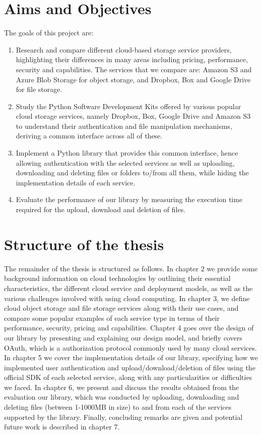 \section{Aims and Objectives}
The goals of this project are:

\begin{enumerate}
	\item Research and compare different cloud-based storage service providers, highlighting their differences in many areas including pricing, performance, security and capabilities. The services that we compare are: Amazon S3 and Azure Blob Storage for object storage, and Dropbox, Box and Google Drive for file storage.
	
	\item Study the Python Software Development Kits offered by various popular cloud storage services, namely Dropbox, Box, Google Drive and Amazon S3 to understand their authentication and file manipulation mechanisms, deriving a common interface across all of these.
	
	\item Implement a Python library that provides this common interface, hence allowing authentication with the selected services as well as uploading, downloading and deleting files or folders to/from all them, while hiding the implementation details of each service.
	
	\item Evaluate the performance of our library by measuring the execution time required for the upload, download and deletion of files.
\end{enumerate}

\section{Structure of the thesis}
The remainder of the thesis is structured as follows. In chapter 2 we provide some background information on cloud technologies by outlining their essential characteristics, the different cloud service and deployment models, as well as the various challenges involved with using cloud computing. In chapter 3, we define cloud object storage and file storage services along with their use cases, and compare some popular examples of each service type in terms of their performance, security, pricing and capabilities. Chapter 4 goes over the design of our library by presenting and explaining our design model, and briefly covers OAuth, which is a authorization protocol commonly used by many cloud services. In chapter 5 we cover the implementation details of our library, specifying how we implemented user authentication and upload/download/deletion of files using the official SDK of each selected service, along with any particularities or difficulties we faced. In chapter 6, we present and discuss the results obtained from the evaluation our library, which was conducted by uploading, downloading and deleting files (between 1-1000MB in size) to and from each of the services supported by the library. Finally, concluding remarks are given and potential future work is described in chapter 7.
